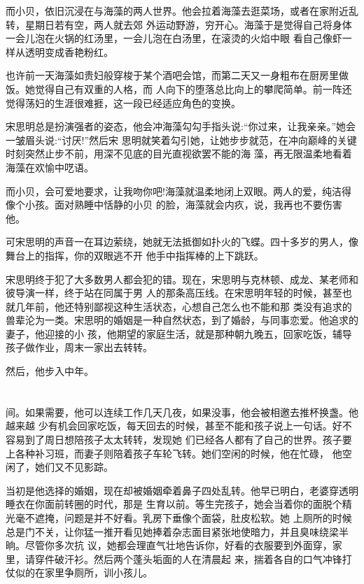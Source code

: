 \documentclass[11pt,a4paper,onecolumn]{article}
\begin{document}
而小贝，依旧沉浸在与海藻的两人世界。他会拉着海藻去逛菜场，或者在家附近乱转，星期日若有空，两人就去郊
外运动野游，穷开心。海藻于是觉得自己将身体一会儿泡在火锅的红汤里，一会儿泡在白汤里，在滚烫的火焰中眼
看自己像虾一样从透明变成香艳粉红。

也许前一天海藻如贵妇般穿梭于某个酒吧会馆，而第二天又一身粗布在厨房里做饭。她觉得自己有双重的人格，而
人向下的堕落总比向上的攀爬简单。前一阵还觉得荡妇的生涯很难捱，这一段已经适应角色的变换。

宋思明总是扮演强者的姿态，他会冲海藻勾勾手指头说:``你过来，让我亲亲。''她会一皱眉头说:``讨厌!''然后宋
思明就笑着勾引她，让她步步就范，在冲向巅峰的关键时刻突然止步不前，用深不见底的目光直视欲罢不能的海
藻，再无限温柔地看着海藻在欢愉中呓语。

而小贝，会可爱地要求，让我吻你吧!海藻就温柔地闭上双眼。两人的爱，纯洁得像个小孩。面对熟睡中恬静的小贝
的脸，海藻就会内疚，说，我再也不要伤害他。

可宋思明的声音一在耳边萦绕，她就无法抵御如扑火的飞蝶。四十多岁的男人，像舞台上的指挥，你的双眼逃不开
他手中指挥棒的上下跳跃。

宋思明终于犯了大多数男人都会犯的错。现在，宋思明与克林顿、成龙、某老师和彼导演一样，终于站在同属于男
人的那条高压线。在宋思明年轻的时候，甚至也就几年前，他还特别鄙视这种生活状态，心想自己怎么也不能和那
类没有追求的兽辈沦为一类。宋思明的婚姻是一种自然状态，到了婚龄，与同事恋爱。他追求的妻子，他迎接的小
孩，他期望的家庭生活，就是那种朝九晚五，回家吃饭，辅导孩子做作业，周末一家出去转转。

然后，他步入中年。

\section[\thesection]{}间。如果需要，他可以连续工作几天几夜，如果没事，他会被相邀去推杯换盏。他越来越
少有机会回家吃饭，每天回去的时候，甚至不能和孩子说上一句话。好不容易到了周日想陪孩子太太转转，发现她
们已经各人都有了自己的世界。孩子要上各种补习班，而妻子则陪着孩子车轮飞转。她们空闲的时候，他在忙碌，
他空闲了，她们又不见影踪。

当初是他选择的婚姻，现在却被婚姻牵着鼻子四处乱转。他早已明白，老婆穿透明睡衣在你面前转圈的时代，那是
生育以前。等生完孩子，她会当着你的面脱个精光毫不遮掩，问题是并不好看。乳房下垂像个面袋，肚皮松软。她
上厕所的时候总是门不关，让你猛一推开看见她捧着杂志面目紧张地使暗力，并且臭味绕梁半晌。尽管你多次抗
议，她都会理直气壮地告诉你，好看的衣服要到外面穿，家里，请穿件破汗衫。然后两个蓬头垢面的人在清晨起
来，揣着各自的口气冲锋打仗似的在家里争厕所，训小孩儿。
\end{document}
